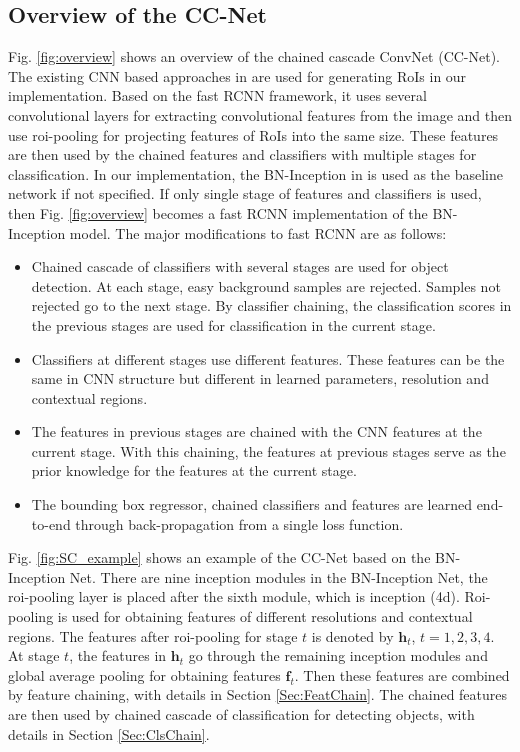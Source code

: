 \documentclass[10pt,twocolumn,letterpaper]{article}
\begin{document}
\subsection{Overview of the CC-Net}
Fig. \ref{fig:overview} shows an overview of the chained cascade ConvNet (CC-Net). The existing CNN based approaches in \cite{yang2016craft, gidaris2016attend} are used for generating RoIs in our implementation. 
 Based on the fast RCNN framework, it uses several convolutional layers for extracting convolutional features from the image and then use roi-pooling for projecting features of RoIs into the same size. These features are then used by the chained features and classifiers with multiple stages for classification. In our implementation, the BN-Inception in \cite{ioffe2015batch} is used as the baseline network if not specified. If only single stage of features and classifiers is used, then Fig. \ref{fig:overview}  becomes a fast RCNN implementation of the BN-Inception model. The major modifications to fast RCNN are as follows:
\begin{itemize}
\item Chained cascade of classifiers with several stages are used for object detection. At each stage, easy background samples are rejected. Samples not rejected go to the next stage. By classifier chaining, the classification scores in the previous stages are used for  classification in the current stage.
\item Classifiers at different stages use different features. These features can be the same in CNN structure but different in learned parameters, resolution and contextual regions.
\item The features in previous stages are chained with the CNN features at the current stage. With this chaining, the features at previous stages serve as the prior knowledge for the features at the current stage. 
\item The bounding box regressor, chained classifiers and features are learned end-to-end through back-propagation from a single loss function.
\end{itemize}

Fig. \ref{fig:SC_example} shows an example of the CC-Net based on the BN-Inception Net. There are nine inception modules in the BN-Inception Net, the roi-pooling layer is placed after the sixth module, which is inception (4d). Roi-pooling is used for obtaining features of different resolutions and contextual regions. The features after roi-pooling for stage $t$ is denoted by $\mathbf{h}_t$, $t=1, 2, 3, 4$. At stage $t$, the features in $\mathbf{h}_t$ go through the remaining inception modules and global average pooling for obtaining features $\mathbf{f}_t$. Then these features are combined by feature chaining, with details in Section \ref{Sec:FeatChain}. The chained features are then used by chained cascade of classification for detecting objects, with details in Section \ref{Sec:ClsChain}.
\end{document}
